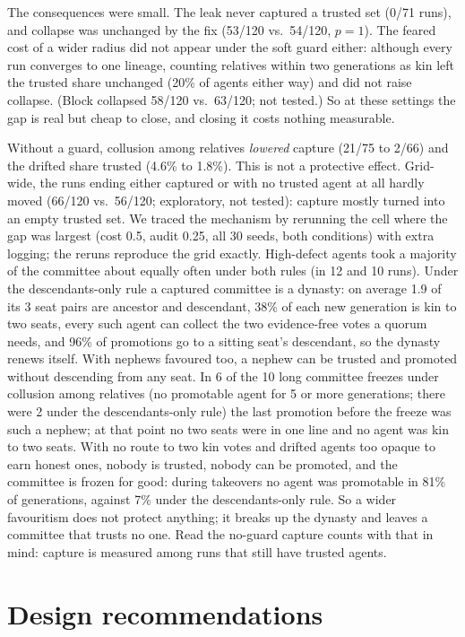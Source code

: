 \documentclass[11pt]{article}
\begin{document}
The consequences were small. The leak never captured a trusted set (0/71 runs), and collapse
was unchanged by the fix (53/120 vs.\ 54/120, $p = 1$). The feared cost of a wider radius
did not appear under the soft guard either: although every run converges to one lineage,
counting relatives within two generations as kin left the trusted share unchanged (20\% of
agents either way) and did not raise collapse. (Block collapsed 58/120 vs.\ 63/120; not
tested.) So at these settings the gap
is real but cheap to close, and closing it costs nothing measurable.

Without a guard, collusion among relatives \emph{lowered} capture (21/75 to 2/66) and the drifted share
trusted (4.6\% to 1.8\%). This is not a protective effect. Grid-wide, the runs ending either
captured or with no trusted agent at all hardly moved (66/120 vs.\ 56/120; exploratory, not
tested): capture mostly turned into an empty trusted set. We traced the mechanism by rerunning
the cell where the gap was largest (cost 0.5, audit 0.25, all 30 seeds, both conditions) with
extra logging; the reruns reproduce the grid exactly. High-defect agents took a majority of the
committee about equally often under both rules (in 12 and 10 runs). Under the descendants-only
rule a captured committee is a dynasty: on average 1.9 of its 3 seat pairs are ancestor and
descendant, 38\% of each new generation is kin to two seats, every such agent can collect the
two evidence-free votes a quorum needs, and 96\% of promotions go to a sitting seat's
descendant, so the dynasty renews itself. With nephews favoured too, a nephew can be trusted
and promoted without descending from any seat. In 6 of the 10 long committee freezes under collusion among relatives
(no promotable agent for 5 or more generations; there were 2 under the descendants-only rule) the last promotion before the freeze was such
a nephew; at that point no two seats were in one line and no agent was kin to two seats. With
no route to two kin votes and drifted agents too opaque to earn honest ones, nobody is
trusted, nobody can be promoted, and the committee is frozen for good: during takeovers no
agent was promotable in 81\% of generations, against 7\% under the descendants-only rule.
So a wider favouritism does not protect anything; it breaks up the dynasty and leaves a
committee that trusts no one. Read the no-guard capture counts with that in mind: capture is
measured among runs that still have trusted agents.

\section{Design recommendations}
\end{document}
